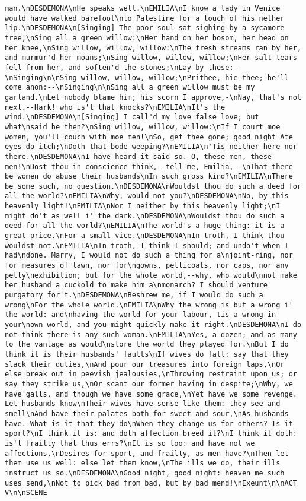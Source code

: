 \begin{verbatim}
man.\nDESDEMONA\nHe speaks well.\nEMILIA\nI know a lady in Venice would have walked barefoot\nto Palestine for a touch of his nether lip.\nDESDEMONA\n[Singing] The poor soul sat sighing by a sycamore tree,\nSing all a green willow:\nHer hand on her bosom, her head on her knee,\nSing willow, willow, willow:\nThe fresh streams ran by her, and murmur'd her moans;\nSing willow, willow, willow;\nHer salt tears fell from her, and soften'd the stones;\nLay by these:--\nSinging\n\nSing willow, willow, willow;\nPrithee, hie thee; he'll come anon:--\nSinging\n\nSing all a green willow must be my garland.\nLet nobody blame him; his scorn I approve,-\nNay, that's not next.--Hark! who is't that knocks?\nEMILIA\nIt's the wind.\nDESDEMONA\n[Singing] I call'd my love false love; but what\nsaid he then?\nSing willow, willow, willow:\nIf I court moe women, you'll couch with moe men!\nSo, get thee gone; good night Ate eyes do itch;\nDoth that bode weeping?\nEMILIA\n'Tis neither here nor there.\nDESDEMONA\nI have heard it said so. O, these men, these men!\nDost thou in conscience think,--tell me, Emilia,--\nThat there be women do abuse their husbands\nIn such gross kind?\nEMILIA\nThere be some such, no question.\nDESDEMONA\nWouldst thou do such a deed for all the world?\nEMILIA\nWhy, would not you?\nDESDEMONA\nNo, by this heavenly light!\nEMILIA\nNor I neither by this heavenly light;\nI might do't as well i' the dark.\nDESDEMONA\nWouldst thou do such a deed for all the world?\nEMILIA\nThe world's a huge thing: it is a great price.\nFor a small vice.\nDESDEMONA\nIn troth, I think thou wouldst not.\nEMILIA\nIn troth, I think I should; and undo't when I had\ndone. Marry, I would not do such a thing for a\njoint-ring, nor for measures of lawn, nor for\ngowns, petticoats, nor caps, nor any petty\nexhibition; but for the whole world,--why, who would\nnot make her husband a cuckold to make him a\nmonarch? I should venture purgatory for't.\nDESDEMONA\nBeshrew me, if I would do such a wrong\nFor the whole world.\nEMILIA\nWhy the wrong is but a wrong i' the world: and\nhaving the world for your labour, tis a wrong in your\nown world, and you might quickly make it right.\nDESDEMONA\nI do not think there is any such woman.\nEMILIA\nYes, a dozen; and as many to the vantage as would\nstore the world they played for.\nBut I do think it is their husbands' faults\nIf wives do fall: say that they slack their duties,\nAnd pour our treasures into foreign laps,\nOr else break out in peevish jealousies,\nThrowing restraint upon us; or say they strike us,\nOr scant our former having in despite;\nWhy, we have galls, and though we have some grace,\nYet have we some revenge. Let husbands know\nTheir wives have sense like them: they see and smell\nAnd have their palates both for sweet and sour,\nAs husbands have. What is it that they do\nWhen they change us for others? Is it sport?\nI think it is: and doth affection breed it?\nI think it doth: is't frailty that thus errs?\nIt is so too: and have not we affections,\nDesires for sport, and frailty, as men have?\nThen let them use us well: else let them know,\nThe ills we do, their ills instruct us so.\nDESDEMONA\nGood night, good night: heaven me such uses send,\nNot to pick bad from bad, but by bad mend!\nExeunt\n\nACT V\n\nSCENE 
\end{verbatim}
